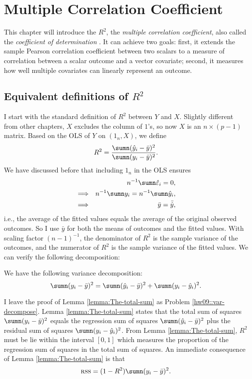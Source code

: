  
\chapter{Multiple Correlation Coefficient}
 
This chapter will introduce the $R^2$,  the {\it multiple correlation coefficient}, also called the {\it coefficient of determination} \citep{sewall1921correlation}. It can achieve two goals: 
first, it extends the sample Pearson correlation
coefficient between two scalars to a measure of correlation between a
scalar outcome and a vector covariate;
second, it measures how well multiple covariates
can linearly represent an outcome.
 

\section{Equivalent definitions of $R^{2}$}

I start with the standard definition of $R^{2}$ between $Y$ and $X$.  
Slightly different from other chapters, $X$ excludes the column of $1$'s, so now $X$ is an $n\times (p-1)$ matrix. 
Based on the OLS of $Y$ on $(1_n, X)$, we define 
\[
R^{2}=\frac{\sumn(\hat{y}_{i}-\bar{y})^{2}}{\sumn(y_{i}-\bar{y})^{2}}.
\]
We have discussed before that including $1_{n}$ in the OLS ensures
\begin{eqnarray*}
&&n^{-1}\sumn\hat{\varepsilon}_{i}=0 , \\
&\Longrightarrow & n^{-1}\sumn y_{i}=n^{-1}\sumn\hat{y}_{i} , \\
&\Longrightarrow & \bar{y}=\bar{\hat{y}},
\end{eqnarray*}
i.e., the average of the fitted values equals the average of the original observed
outcomes. So I use $\bar{y}$ for both the means of outcomes
and the fitted values. With scaling factor $(n-1)^{-1}$, the denominator
of $R^{2}$ is the sample variance of the outcomes, and the numerator
of $R^{2}$ is the sample variance of the fitted values. We can verify
the following decomposition:
\begin{lemma} 
\label{lemma:The-total-sum}We have the following variance decomposition: 
\[
\sumn(y_{i}-\bar{y})^{2}=\sumn(\hat{y}_{i}-\bar{y})^{2}+\sumn(y_{i}-\hat{y}_{i})^{2}.
\]
\end{lemma}

I leave the proof of Lemma \ref{lemma:The-total-sum} as Problem \ref{hw09::var-decompose}. 
Lemma \ref{lemma:The-total-sum} states that the total sum of squares $\sumn(y_{i}-\bar{y})^{2}$
equals  the regression sum of squares $\sumn(\hat{y}_{i}-\bar{y})^{2}$
plus the residual sum of squares $\sumn(y_{i}-\hat{y}_{i})^{2}$. 
From Lemma
\ref{lemma:The-total-sum}, $R^{2}$ must be lie within the interval
$[0,1]$ which measures the proportion of the regression sum of squares
in the total sum of squares. An immediate consequence of Lemma \ref{lemma:The-total-sum} is that
$$
\textsc{rss} = (1-R^2) \sumn(y_{i}-\bar{y})^{2}.
$$

